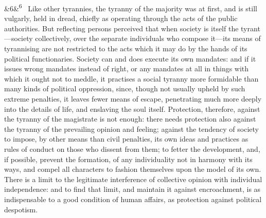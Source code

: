 \documentclass[12pt]{article}
\newcommand{\para}[1][]{\par\noindent\ifx&#1&\else\textsuperscript{\footnotesize #1}~\fi}
\begin{document}
\para[6] Like other tyrannies, the tyranny of the majority was at first, and is still vulgarly, held in dread, chiefly as operating through the acts of the public authorities. But reflecting persons perceived that when society is itself the tyrant---society collectively, over the separate individuals who compose it---its means of tyrannising are not restricted to the acts which it may do by the hands of its political functionaries. Society can and does execute its own mandates: and if it issues wrong mandates instead of right, or any mandates at all in things with which it ought not to meddle, it practises a social tyranny more formidable than many kinds of political oppression, since, though not usually upheld by such extreme penalties, it leaves fewer means of escape, penetrating much more deeply into the details of life, and enslaving the soul itself. Protection, therefore, against the tyranny of the magistrate is not enough: there needs protection also against the tyranny of the prevailing opinion and feeling; against the tendency of society to impose, by other means than civil penalties, its own ideas and practices as rules of conduct on those who dissent from them; to fetter the development, and, if possible, prevent the formation, of any individuality not in harmony with its ways, and compel all characters to fashion themselves upon the model of its own. There is a limit to the legitimate interference of collective opinion with individual independence: and to find that limit, and maintain it against encroachment, is as indispensable to a good condition of human affairs, as protection against political despotism.
\end{document}
